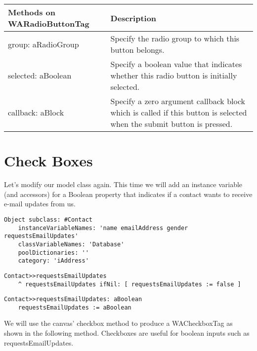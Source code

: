\documentclass[a4paper,10pt,twoside]{book}
\newcommand{\ct}[1]{{\small\ttfamily\textup{#1}}}
\begin{document}
\begin{tabularx}{\textwidth}{lX}
\textbf{Methods on \ct{WARadioButtonTag} }&\textbf{Description}\\ \hline
\index{WARadioButtonTag!group: aRadioGroup} \ct{group: aRadioGroup}& Specify the radio group to which this button belongs. \\
\index{WARadioButtonTag!selected: aBoolean} \ct{selected: aBoolean}& Specify a boolean value that indicates whether this radio button  is initially selected. \\
\index{WARadioButtonTag!callback: aBlock} \ct{callback: aBlock}&Specify a zero argument callback block which is called if this button is selected when the submit button is pressed.\\
\end{tabularx}

\section{Check Boxes}
\label{book:fundamentals:forms:checkboxes}


Let's modify our model class again. This time we will add an instance variable (and accessors) for a Boolean property that indicates if a contact wants to receive e-mail updates from us.

\begin{lstlisting}
Object subclass: #Contact
    instanceVariableNames: 'name emailAddress gender requestsEmailUpdates'
    classVariableNames: 'Database'
    poolDictionaries: ''
    category: 'iAddress'
\end{lstlisting}

\begin{lstlisting}
Contact>>requestsEmailUpdates
    ^ requestsEmailUpdates ifNil: [ requestsEmailUpdates := false ]
\end{lstlisting}

\begin{lstlisting}
Contact>>requestsEmailUpdates: aBoolean
    requestsEmailUpdates := aBoolean
\end{lstlisting}

We will use the canvas'  \ct{checkbox} method to produce a  \ct{WACheckboxTag} as shown in the following method. Checkboxes are useful for boolean inputs such as \ct{requestsEmailUpdates}.
\end{document}
